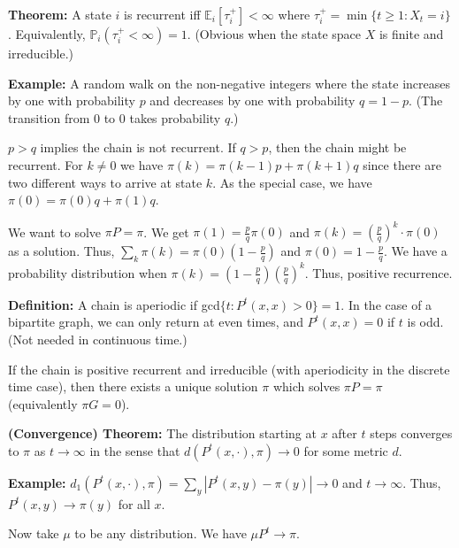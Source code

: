 \documentclass[../../../Master/AppliedStochastics.tex]{subfiles}
\newcommand{\I}{\infty}
\newcommand{\ta}{\tau}
\newcommand{\PP}{{\mathbb{P}}}
\newcommand{\EE}{{\mathbb{E}}}
\begin{document}
\vspace{5mm}
\textbf{Theorem:} A state $i$ is recurrent iff $\EE_i[\ta_{i}^+]<\I$ where $\ta_i^+=\min\{t\geq 1:X_t=i\}$.  Equivalently, $\PP_i(\ta_i^+<\I)=1$. (Obvious when the state space $X$ is finite and irreducible.)



\vspace{10mm}
\textbf{Example:} A random walk on the non-negative integers where the state increases by one with probability $p$ and decreases by one with probability $q=1-p$. (The transition from 0 to 0 takes probability $q$.) 

\vspace{5mm}
$p>q$ implies the chain is not recurrent. If $q>p$, then the chain might be recurrent. For $k\neq 0$ we have $\pi(k)=\pi(k-1)p+\pi(k+1)q$ since there are two different ways to arrive at state $k$. As the special case, we have $\pi(0)=\pi(0)q+\pi(1)q$. 

\vspace{5mm}
We want to solve $\pi P=\pi$. We get $\pi(1)=\frac{p}{q}\pi(0)$ and $\pi(k)=\left(\frac{p}{q}\right)^k\cdot\pi(0)$ as a solution. Thus, $\sum_k\pi(k)=\pi(0)\left(1-\frac{p}{q}\right)$ and $\pi(0)=1-\frac{p}{q}$. We have a probability distribution when $\pi(k)=\left(1-\frac{p}{q}\right)\left(\frac{p}{q}\right)^k$. Thus, positive recurrence.

\vspace{10mm}
\textbf{Definition:} A chain is aperiodic if gcd$\{t:P^t(x,x)>0\}=1$. In the case of a bipartite graph, we can only return at even times, and $P^t(x,x)=0$ if $t$ is odd. (Not needed in continuous time.)

\vspace{5mm}
If the chain is positive recurrent and irreducible (with aperiodicity in the discrete time case), then there exists a unique solution $\pi$ which solves $\pi P=\pi$ (equivalently $\pi G=0$).

\vspace{5mm}
\textbf{(Convergence) Theorem:} The distribution starting at $x$ after $t$ steps converges to $\pi$ as $t\to \I$ in the sense that $d(P^t(x,\cdot),\pi)\to 0$ for some metric $d$. 


\vspace{5mm}
\textbf{Example:} $d_1(P^t(x,\cdot),\pi)=\sum_y|P^t(x,y)-\pi(y)|\to 0$ and $t\to\I$. Thus, $P^t(x,y)\to\pi(y)$ for all $x$. 

\vspace{5mm}
Now take $\mu$ to be any distribution. We have $\mu P^t\to \pi$. 
\end{document}

